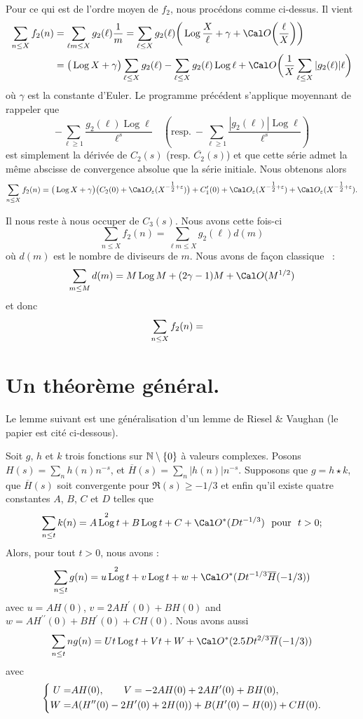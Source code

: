 \documentclass[12pt,a4paper,twoside]{article}
\let\ve=\varepsilon
\DeclareMathOperator{\Log}{Log}
\begin{document}
\bigskip
Pour ce qui est de l'ordre moyen de $f_2$, nous proc\'edons comme
ci-dessus. Il vient
$$
\aligned
\sum_{n\le X}f_2(n)
&=\sum_{\ell m\le X}g_2(\ell)\frac{1}m
=\sum_{\ell\le X}g_2(\ell)
\bigg(\Log\frac X\ell+\gamma
+\Cal O\bigg(\frac \ell X\bigg)\bigg)
\\&=
\big(\Log X +\gamma\big)\sum_{\ell\le X}g_2(\ell)
-\sum_{\ell\le X}g_2(\ell)\Log\ell
+\Cal O\bigg(\frac1X\sum_{\ell\le X}|g_2(\ell)|\ell\bigg)
\endaligned
$$
o\`u $\gamma$ est la constante d'Euler. 
Le programme pr\'ec\'edent s'applique moyennant de rappeler que
$$
-\sum_{\ell\ge1}\frac{g_2(\ell)\Log\ell}{\ell^s}
\quad\left( \text{resp.}\ 
-\sum_{\ell\ge1}\frac{|g_2(\ell)|\Log\ell}{\ell^s} \right)
$$
est simplement la d\'eriv\'ee de $C_2(s)$ (resp. $\overline{C_2}(s)$)
et que cette s\'erie admet la m\^eme abscisse de convergence absolue
que la s\'erie initiale. Nous obtenons alors
$$
\sum_{n\le X}f_2(n)=
\big(\Log X +\gamma\big)\big(C_2(0)+\Cal O_\ve(X^{-\tfrac12+\ve})\big)
+C'_1(0)+\Cal O_\ve(X^{-\tfrac12+\ve})+\Cal O_\ve(X^{-\tfrac12+\ve}).
$$

\bigskip
Il nous reste \`a nous occuper de $C_3(s)$. Nous avons cette fois-ci
$$
\sum_{n\le X}f_2(n)
=\sum_{\ell m\le X}g_2(\ell)d(m)
$$
o\`u $d(m)$ est le nombre de diviseurs de $m$. Nous avons de fa\c con
classique ~:
$$
\sum_{m\le M}d(m)=M\Log M+(2\gamma-1)M+\Cal O(M^{1/2})
$$
et donc
$$
\aligned
\sum_{n\le X}f_2(n)
&=
\endaligned
$$

\section{Un th\'eor\`eme g\'en\'eral.}

Le lemme suivant est une g\'en\'eralisation d'un lemme de Riesel \&
Vaughan (le papier est cit\'e ci-dessous).
\def\O{\Cal O^*}

Soit $g$, $h$ et $k$ trois fonctions sur $\Bbb N\setminus\{0\}$ \`a
valeurs complexes.
Posons $H(s)=\sum_nh(n)n^{-s}$, et
$\overline{H}(s)=\sum_n|h(n)|n^{-s}$.
Supposons que $g=h\star k$, que $\overline{H}(s)$ soit convergente pour
$\Re(s)\ge-1/3$ et enfin qu'il existe quatre constantes
$A$, $B$, $C$ et $D$ telles que
$$
\sum_{n\le t}k(n)
=
A\Log^2t+B\Log t+C+\O(D t^{-1/3})
\text{\ \ pour\ \ }
t>0;
$$
Alors, pour tout $t>0$, nous avons :
$$
\sum_{n\le t}g(n)
=
u\Log^2t+v\Log t+w+\O(D t^{-1/3}\overline{H}(-1/3))
$$
avec
$u=AH(0)$, $v=2AH^{\prime}(0)+BH(0)$ and $w=AH^{\prime\prime}(0)+BH^{\prime}(0)+CH(0)$.
Nous avons aussi
$$
\sum_{n\le t}ng(n)
=
Ut\Log t+Vt+W+\O(2.5D t^{2/3}\overline{H}(-1/3))
$$
avec
$$
\left\{\aligned
U=&AH(0),\text{\ \ \ \ \ \ }V=-2AH(0)+2AH^{\prime}(0)+BH(0),\\
W=&A(H^{\prime\prime}(0)-2H^{\prime}(0)+2H(0))+B(H^{\prime}(0)-H(0))+CH(0).
\endaligned\right.
$$
\endproclaim
\end{document}
